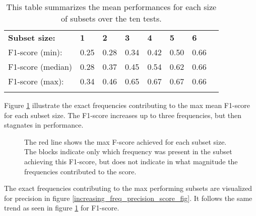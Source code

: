 \begin{longtable}{llllllll}
\caption[Summary exhaustive search]{This table summarizes the mean performances for each size of subsets over the ten tests. }\\
                  &      &      &      &      &      &      &  \\ \hline
\endfirsthead
%
\endhead
%
\hline
\endfoot
%
\endlastfoot
%
\textbf{Subset size:}      & \textbf{1}    & \textbf{2}    & \textbf{3}    & \textbf{4}    & \textbf{5}    & \textbf{6}    &  \\ \hline
F1-score (min):   & 0.25 & 0.28 & 0.34 & 0.42 & 0.50 & 0.66 &  \\
F1-score (median) & 0.28 & 0.37 & 0.45 & 0.54 & 0.62 & 0.66 &  \\
F1-score (max):   & 0.34 & 0.46 & 0.65 & 0.67 & 0.67 & 0.66 &  \\ \hline
\label{summary_per_subset_size_table}

\end{longtable}

Figure \ref{increasing_freq_f1_score_fig} illustrate the exact frequencies contributing to the max mean F1-score for each subset size. The F1-score increases up to three frequencies, but then stagnates in performance.

        \begin{figure}[H]
            \centering
            
            \caption[Best frequency combination - F1-score]{The red line shows the max F-score achieved for each subset size. The blocks indicate only which frequency was present in the subset achieving this F1-score, but does not indicate in what magnitude the frequencies contributed to the score.}
          	\medskip 
            \label{increasing_freq_f1_score_fig}
        \end{figure}

    The exact frequencies contributing to the max performing subsets are visualized for precision in figure \ref{increasing_freq_precision_score_fig}. It follows the same trend as seen in figure \ref{increasing_freq_f1_score_fig} for F1-score.

